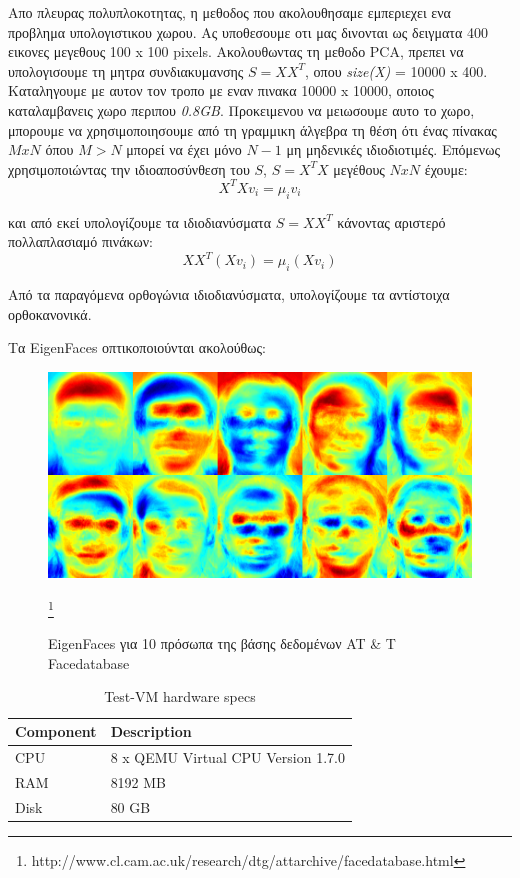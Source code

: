 Απο πλευρας πολυπλοκοτητας, η μεθοδος που ακολουθησαμε εμπεριεχει ενα προβλημα
υπολογιστικου χωρου. Ας υποθεσουμε οτι μας δινονται ως δειγματα 400 εικονες
μεγεθους 100 x 100 pixels. Ακολουθωντας τη μεθοδο PCA, πρεπει να υπολογισουμε
τη μητρα συνδιακυμανσης $ S = XX^T $, οπου \emph{size(X)} = 10000 x 400. Καταληγουμε
με αυτον τον τροπο με εναν πινακα 10000 x 10000, οποιος καταλαμβανεις χωρο περιπου
\emph{0.8GB}.
Προκειμενου να μειωσουμε αυτο το χωρο, μπορουμε να χρησιμοποιησουμε από τη γραμμικη
άλγεβρα τη θέση ότι ένας πίνακας $M x N$ όπου $Μ > Ν$ μπορεί να έχει μόνο $N-1$
μη μηδενικές ιδιοδιοτιμές. Επόμενως χρησιμοποιώντας την ιδιοαποσύνθεση του $S$, $S=X^TX$
μεγέθους $NxN$ έχουμε:
\begin{equation}
    X^TXv_i = \mu_iv_i
    \tag{6}
    \label{eq:6}
\end{equation}

και από εκεί υπολογίζουμε τα ιδιοδιανύσματα $S = XX^T$ κάνοντας αριστερό πολλαπλασιαμό
πινάκων:
\begin{equation}
    XX^T(Xv_i) = \mu_i(Xv_i)
    \tag{7}
    \label{eq:7}
\end{equation}

Από τα παραγόμενα ορθογώνια ιδιοδιανύσματα, υπολογίζουμε τα αντίστοιχα ορθοκανονικά.

Τα EigenFaces οπτικοποιούνται ακολούθως:



\begin{figure}[htbp]
  \begin{center}
    \includegraphics[width=0.8\maxwidth]{../figures/eigenfaces.png}
      \caption{EigenFaces για 10 πρόσωπα της βάσης δεδομένων AT \& T Facedatabase}\footnote{http://www.cl.cam.ac.uk/research/dtg/attarchive/facedatabase.html}
      \label{fig:eigenfaces}
   \end{center}
\end{figure}


\begin{table}[htbp]
  \centering
  \begin{tabular}{ | l | l | }
    \hline
    Component & Description \\ \hline \hline
    CPU & 8 x QEMU Virtual CPU Version 1.7.0 \\
    \hline
    RAΜ & 8192 MB  \\
    \hline
    Disk & 80 GB \\
    \hline
  \end{tabular}
  \caption{Test-VM hardware specs}
  \label{tab:hw-specs}
\end{table}

